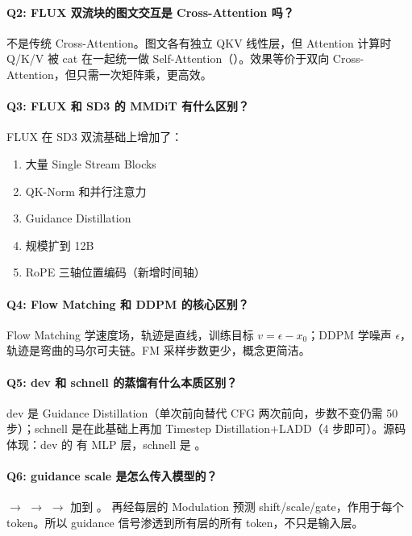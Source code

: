 \paragraph{Q2: FLUX 双流块的图文交互是 Cross-Attention 吗？}
不是传统 Cross-Attention。图文各有独立 QKV 线性层，但 Attention 计算时 Q/K/V 被 cat 在一起统一做 Self-Attention（）。效果等价于双向 Cross-Attention，但只需一次矩阵乘，更高效。

\paragraph{Q3: FLUX 和 SD3 的 MMDiT 有什么区别？}
FLUX 在 SD3 双流基础上增加了：
\begin{enumerate}[leftmargin=1.5em]
  \item 大量 Single Stream Blocks
  \item QK-Norm 和并行注意力
  \item Guidance Distillation
  \item 规模扩到 12B
  \item RoPE 三轴位置编码（新增时间轴）
\end{enumerate}

\paragraph{Q4: Flow Matching 和 DDPM 的核心区别？}
Flow Matching 学速度场，轨迹是直线，训练目标 $v = \epsilon - x_0$；DDPM 学噪声 $\epsilon$，轨迹是弯曲的马尔可夫链。FM 采样步数更少，概念更简洁。

\paragraph{Q5: dev 和 schnell 的蒸馏有什么本质区别？}
dev 是 Guidance Distillation（单次前向替代 CFG 两次前向，步数不变仍需 50 步）；schnell 是在此基础上再加 Timestep Distillation+LADD（4 步即可）。源码体现：dev 的  有  MLP 层，schnell 是 。

\paragraph{Q6: guidance scale 是怎么传入模型的？}
 $\to$  $\to$  $\to$ 加到 。 再经每层的 Modulation 预测 shift/scale/gate，作用于每个 token。所以 guidance 信号渗透到所有层的所有 token，不只是输入层。

